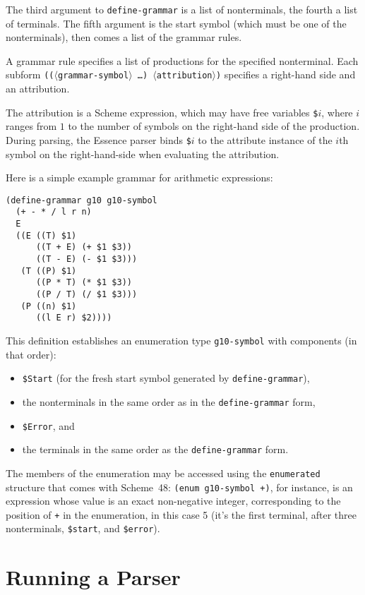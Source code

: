 \documentclass{article}
\newcommand{\meta}[1]{{\noindent\mbox{\textrm{$\langle$#1$\rangle$}}}}
\newcommand{\dotsfoo}{\ldots\texonly{\thinspace}}
\newcommand{\codefont}[1]{\texttt{#1}}
\begin{document}
The third argument to \codefont{define-grammar} is a list of
nonterminals, the fourth a list of terminals.  The fifth argument is
the start symbol (which must be one of the nonterminals), then comes a
list of the grammar rules.

A grammar rule specifies a list of productions for the specified
nonterminal.  Each subform \texttt{((\meta{grammar-symbol} \dotsfoo)
  \meta{attribution})}
specifies a right-hand side and an attribution.

The attribution is a Scheme expression, which may have free variables
\codefont{\$}$i$, where $i$ ranges from $1$ to the number of symbols
on the right-hand side of the production.  During parsing, the Essence
parser binds \codefont{\$}$i$ to the attribute instance of the $i$th
symbol on the right-hand-side when evaluating the attribution.

Here is a simple example grammar for arithmetic expressions:
%
\begin{verbatim}
(define-grammar g10 g10-symbol
  (+ - * / l r n)
  E
  ((E ((T) $1)
      ((T + E) (+ $1 $3))
      ((T - E) (- $1 $3)))
   (T ((P) $1)
      ((P * T) (* $1 $3))
      ((P / T) (/ $1 $3)))
   (P ((n) $1)
      ((l E r) $2))))
\end{verbatim}
%
This definition establishes an enumeration type \codefont{g10-symbol}
with components (in that order):
%
\label{list:grammar-enum}
%
\begin{itemize}
\item \codefont{\$Start} (for the fresh start symbol generated by
  \codefont{define-grammar}),
\item the nonterminals in the same order as in the
  \codefont{define-grammar} form,
\item \codefont{\$Error}, and
\item the terminals in the same order as the \codefont{define-grammar}
  form.
\end{itemize}
%
The members of the enumeration may be accessed using the
\codefont{enumerated} structure that comes with Scheme~48:
\codefont{(enum g10-symbol +)}, for instance, is an expression whose
value is an exact non-negative integer, corresponding to the position
of \codefont{+} in the enumeration, in this case 5 (it's the first
terminal, after three nonterminals, \codefont{\$start}, and
\codefont{\$error}).

\section{Running a Parser}
\label{sec:running-a-parser}
\end{document}
